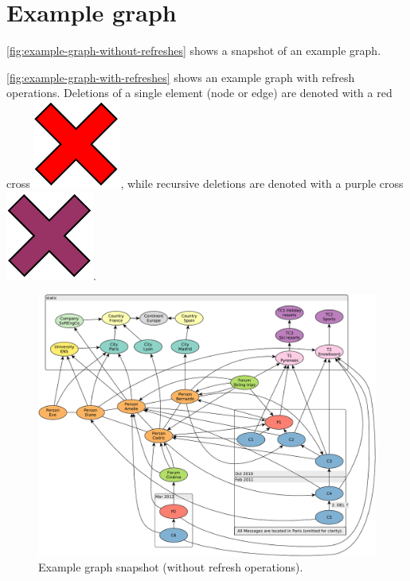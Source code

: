 \chapter{Example graph}
\label{sec:example-graph}

\autoref{fig:example-graph-without-refreshes} shows a snapshot of an example graph.

\autoref{fig:example-graph-with-refreshes} shows an example graph with refresh operations. Deletions of a single element (node or edge) are denoted with a red cross \includegraphics[scale=0.14]{patterns/delete-single}, while recursive deletions are denoted with a purple cross \includegraphics[scale=0.14]{patterns/delete-recursively}.

\begin{figure}[ht]
    \centering
    \includegraphics[scale=\yedscale]{figures/example-graph-without-refreshes}
    \caption{Example graph snapshot (without refresh operations).}
    \label{fig:example-graph-without-refreshes}
\end{figure}

